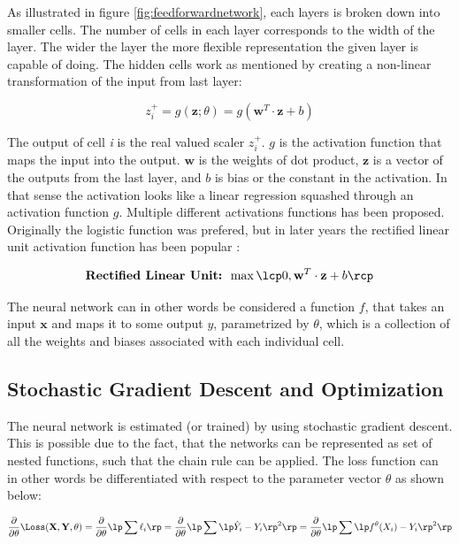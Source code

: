 As illustrated in figure \ref{fig:feedforwardnetwork}, each layers is broken down into smaller cells. The number of cells in each layer corresponds to the width of the layer. The wider the layer the more flexible representation the given layer is capable of doing. The hidden cells work as mentioned by creating a non-linear transformation of the input from last layer:

\begin{equation}
    z_i^{+} = g(\textbf{z}; \theta) = g(\textbf{w}^T \cdot \textbf{z} + b)
\end{equation}

The output of cell \textit{i} is the real valued scaler $z_i^+$. $g$ is the activation function that maps the input into the output. $\textbf{w}$ is the weights of dot product, $\textbf{z}$ is a vector of the outputs from the last layer, and $b$ is bias or the constant in the activation. In that sense the activation looks like a linear regression squashed through an activation function $g$. Multiple different activations functions has been proposed. Originally the logistic function was prefered, but in later years the rectified linear unit activation function has been popular \parencite{goodfellow_deep_2016}:

\begin{equation}
    \textbf{Rectified Linear Unit: }  \max \lcp 0, \textbf{w}^T \cdot \textbf{z} + b \rcp
\end{equation}

The neural network can in other words be considered a function $f$, that takes an input $\textbf{x}$ and maps it to some output $y$, parametrized by $\theta$, which is a collection of all the weights and biases associated with each individual cell.

\subsection{Stochastic Gradient Descent and Optimization}

The neural network is estimated (or trained) by using stochastic gradient descent. This is possible due to the fact, that the networks can be represented as set of nested functions, such that the chain rule can be applied. The loss function can in other words be differentiated with respect to the parameter vector $\theta$ as shown below:

\begin{equation}\label{eq:loss_function}
    \frac{\partial}{\partial\theta} \Loss (\textbf{X}, \textbf{Y}, \theta) = \frac{\partial}{\partial\theta} \lp \sum \ell_i \rp = \frac{\partial}{\partial\theta} \lp \sum \lp \hat{Y}_i  - Y_i \rp^2 \rp = \frac{\partial}{\partial\theta} \lp \sum \lp f^{\theta}(X_i)  - Y_i \rp^2 \rp
\end{equation}

